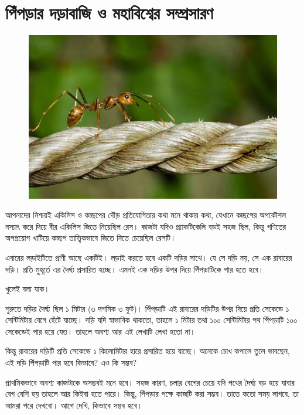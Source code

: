 \documentclass[
]{book}
\begin{document}
\hypertarget{acrobat-ant}{%
\chapter{পিঁপড়ার দড়াবাজি ও মহাবিশ্বের সম্প্রসারণ}\label{acrobat-ant}}

\begin{figure}

{\centering \includegraphics[width=0.8\linewidth]{img/acrobat-ant} 

}

\end{figure}

আপনাদের নিশ্চয়ই একিলিস ও কচ্ছপের দৌড় প্রতিযোগিতার কথা মনে থাকার কথা, যেখানে কচ্ছপের অপকৌশল নস্যাৎ করে দিয়ে বীর একিলিস জিতে নিয়েছিল রেস। কাজটা যদিও প্র্যাকটিকেলি বড়ই সহজ ছিল, কিন্তু গণিতের অপপ্রয়োগ খাটিয়ে কচ্ছপ তাত্ত্বিকভাবে জিতে নিতে চেয়েছিল রেসটি।

এবারের লড়াইটিতে প্রাণী আছে একটিই। লড়াই করতে হবে একটি দড়ির সাথে। যে সে দড়ি নয়, সে এক রাবারের দড়ি। প্রতি মুহূর্তে এর দৈর্ঘ্য প্রসারিত হচ্ছে। এমনই এক দড়ির উপর দিয়ে পিঁপড়াটিকে পার হতে হবে।

খুলেই বলা যাক।~

শুরুতে দড়ির দৈর্ঘ্য ছিল ১ মিটার (৩ দশমিক ৩ ফুট)। পিঁপড়াটি এই রাবারের দড়িটির উপর দিয়ে প্রতি সেকেন্ডে ১ সেন্টিমিটার বেগে হেঁটে যাচ্ছে। দড়ি যদি স্বাভাবিক থাকতো, তাহলে ১ মিটার তথা ১০০ সেন্টিমিটার পথ পিঁপড়াটি ১০০ সেকেন্ডেই পার হয়ে যেত। তাহলে অবশ্য আর এই লেখাটি লেখা হতো না।

কিন্তু রাবারের দড়িটি প্রতি সেকেন্ডে ১ কিলোমিটার হারে প্রসারিত হয়ে যাচ্ছে। অনেকে চোখ কপালে তুলে ভাবছেন, এই দড়ি পিঁপড়াটি পার হবে কিভাবে? এও কি সম্ভব?

প্রাথমিকভাবে অবশ্য কাজটাকে অসম্ভবই মনে হবে। সহজ কারণ, চলার বেগের চেয়ে যদি পথের দৈর্ঘ্য বড় হয়ে যাবার বেগ বেশি হয় তাহলে আর কিইবা হতে পারে। কিন্তু, পিঁপড়ার পক্ষে কাজটি করা সম্ভব। তাতে কতো সময় লাগবে, তা আমরা পরে দেখবো। আগে দেখি, কিভাবে সম্ভব হবে।
\end{document}
